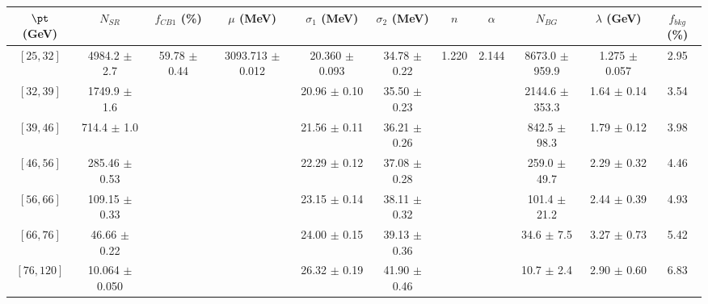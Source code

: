 \begin{tabular}{c||c|c|c|c|c|c|c|c|c||c}
$\pt$ (GeV) & $N_{SR}$ & $f_{CB1}$ (\%) & $\mu$ (MeV) & $\sigma_1$ (MeV) & $\sigma_2$ (MeV) & $n$ & $\alpha$ & $N_{BG}$ & $\lambda$ (GeV) & $f_{bkg}$ (\%) \\
\hline
$[25, 32]$ & 4984.2 $\pm$ 2.7 & \multirow{7}{*}{59.78 $\pm$ 0.44} & \multirow{7}{*}{3093.713 $\pm$ 0.012} & 20.360 $\pm$ 0.093 & 34.78 $\pm$ 0.22 & \multirow{7}{*}{1.220} & \multirow{7}{*}{2.144} & 8673.0 $\pm$ 959.9 & 1.275 $\pm$ 0.057 & 2.95\\
$[32, 39]$ & 1749.9 $\pm$ 1.6 &  &  & 20.96 $\pm$ 0.10 & 35.50 $\pm$ 0.23 &  &  & 2144.6 $\pm$ 353.3 & 1.64 $\pm$ 0.14 & 3.54\\
$[39, 46]$ & 714.4 $\pm$ 1.0 &  &  & 21.56 $\pm$ 0.11 & 36.21 $\pm$ 0.26 &  &  & 842.5 $\pm$ 98.3 & 1.79 $\pm$ 0.12 & 3.98\\
$[46, 56]$ & 285.46 $\pm$ 0.53 &  &  & 22.29 $\pm$ 0.12 & 37.08 $\pm$ 0.28 &  &  & 259.0 $\pm$ 49.7 & 2.29 $\pm$ 0.32 & 4.46\\
$[56, 66]$ & 109.15 $\pm$ 0.33 &  &  & 23.15 $\pm$ 0.14 & 38.11 $\pm$ 0.32 &  &  & 101.4 $\pm$ 21.2 & 2.44 $\pm$ 0.39 & 4.93\\
$[66, 76]$ & 46.66 $\pm$ 0.22 &  &  & 24.00 $\pm$ 0.15 & 39.13 $\pm$ 0.36 &  &  & 34.6 $\pm$ 7.5 & 3.27 $\pm$ 0.73 & 5.42\\
$[76, 120]$ & 10.064 $\pm$ 0.050 &  &  & 26.32 $\pm$ 0.19 & 41.90 $\pm$ 0.46 &  &  & 10.7 $\pm$ 2.4 & 2.90 $\pm$ 0.60 & 6.83\\
\end{tabular}
